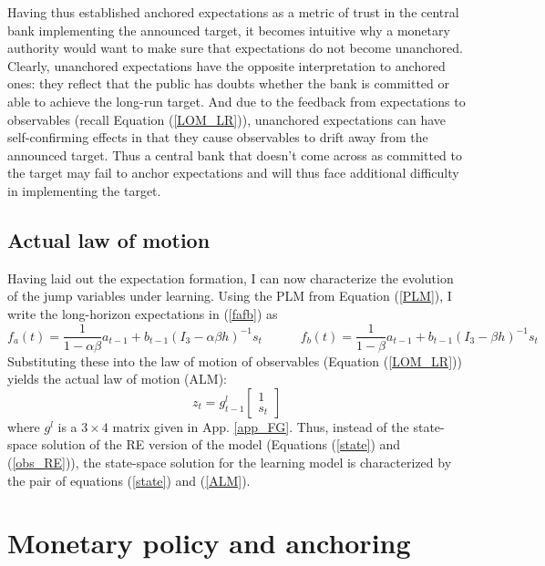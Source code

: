 \documentclass[11pt]{article}
\renewcommand{\[}{\begin{equation}}
\renewcommand{\]}{\end{equation}}
\begin{document}
Having thus established anchored expectations as a metric of trust in the central bank implementing the announced target, it becomes intuitive why a monetary authority would want to make sure that expectations do not become unanchored. Clearly, unanchored expectations have the opposite interpretation to anchored ones: they reflect that the public has doubts whether the bank is committed or able to achieve the long-run target. And due to the feedback from expectations to observables (recall Equation (\ref{LOM_LR})), unanchored expectations can have self-confirming effects in that they cause observables to drift away from the announced target. Thus a central bank that doesn't come across as committed to the target may fail to anchor expectations and will thus face additional difficulty in implementing the target. 

\subsection{Actual law of motion}
Having laid out the expectation formation, I can now characterize the evolution of the jump variables under learning. Using the PLM from Equation (\ref{PLM}), I write the long-horizon expectations in (\ref{fafb}) as
\begin{equation}
f_a(t) = \frac{1}{1-\alpha\beta}a_{t-1}  + b_{t-1}(I_3 - \alpha\beta h)^{-1}s_t \quad \quad \quad f_b(t) = \frac{1}{1-\beta}a_{t-1}  + b_{t-1}(I_3 - \beta h)^{-1}s_t  \label{fafb_anal}
\end{equation}
Substituting these into the law of motion of observables (Equation (\ref{LOM_LR})) yields the actual law of motion (ALM):
\begin{equation}
z_t = g_{t-1}^l \begin{bmatrix} 1 \\ s_t
\end{bmatrix}
\label{ALM}
\end{equation}
where $g^l$ is a $3\times4$ matrix given in App. \ref{app_FG}. Thus, instead of the state-space solution of the RE version of the model (Equations (\ref{state}) and (\ref{obs_RE})), the state-space solution for the learning model is characterized by the pair of equations (\ref{state}) and (\ref{ALM}). 



\section{Monetary policy and anchoring}\label{results}
\end{document}
